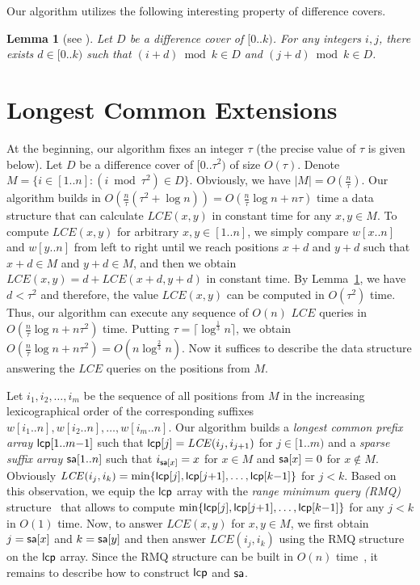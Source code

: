 \documentclass[3p,twocolumn]{elsarticle}
\theoremstyle{plain}
\newtheorem{lemma}{Lemma}
\theoremstyle{definition}
\newcommand{\LCE}{\mathit{LCE}}
\newcommand{\lcp}{{\sf lcp}}
\newcommand{\sa}{{\sf sa}}
\begin{document}
Our algorithm utilizes the following interesting property of difference covers.
\begin{lemma}[see \cite{BurkhardtKarkkainen}]
Let $D$ be a difference cover of $[0..k)$. For any integers $i,j$, there exists $d \in [0..k)$ such that $(i + d) \bmod k \in D$ and $(j + d) \bmod k \in D$.\label{DiffCoverProperty}
\end{lemma}


\section{Longest Common Extensions}

At the beginning, our algorithm fixes an integer $\tau$ (the precise value of $\tau$ is given below). Let $D$ be a difference cover of $[0..\tau^2)$ of size $O(\tau)$. Denote $M = \{i \in [1..n] \colon (i \bmod \tau^2) \in D\}$. Obviously, we have $|M| = O(\frac{n}{\tau})$. Our algorithm builds in $O(\frac{n}{\tau}(\tau^2 + \log n)) = O(\frac{n}{\tau}\log n + n\tau)$ time a data structure that can calculate $\LCE(x, y)$ in constant time for any $x,y \in M$. To compute $\LCE(x, y)$ for arbitrary $x, y \in [1..n]$, we simply compare $w[x..n]$ and $w[y..n]$ from left to right until we reach positions $x+d$ and $y+d$ such that $x+d \in M$ and $y+d \in M$, and then we obtain $\LCE(x, y) = d + \LCE(x + d, y + d)$ in constant time. By Lemma~\ref{DiffCoverProperty}, we have $d < \tau^2$ and therefore, the value $\LCE(x, y)$ can be computed in $O(\tau^2)$ time. Thus, our algorithm can execute any sequence of $O(n)$ $\LCE$ queries in $O(\frac{n}{\tau}\log n + n\tau^2)$ time. Putting $\tau = \lceil\log^{\frac{1}3} n\rceil$, we obtain $O(\frac{n}{\tau}\log n + n\tau^2) = O(n\log^{\frac{2}{3}} n)$. Now it suffices to describe the data structure answering the $\LCE$ queries on the positions from $M$.

Let $i_1, i_2, \ldots, i_m$ be the sequence of all positions from $M$ in the increasing lexicographical order of the corresponding suffixes $w[i_1..n], w[i_2..n], \ldots, w[i_m..n]$. Our algorithm builds a \emph{longest common prefix array} $\lcp[1..m{-}1]$ such that $\lcp[j] = \LCE(i_j, i_{j+1})$ for $j \in [1..m)$ and a \emph{sparse suffix array} $\sa[1..n]$ such that $i_{\sa[x]} = x$ for $x \in M$ and $\sa[x] = 0$ for $x\notin M$. Obviously $\LCE(i_j, i_k) = \min\{\lcp[j], \lcp[j{+}1], \ldots, \lcp[k{-}1]\}$ for $j < k$. Based on this observation, we equip the $\lcp$ array with the \emph{range minimum query (RMQ)} structure~\cite{FischerHeun} that allows to compute $\min\{\lcp[j], \lcp[j{+}1], \ldots, \lcp[k{-}1]\}$ for any $j < k$ in $O(1)$ time. Now, to answer $\LCE(x, y)$ for $x, y \in M$, we first obtain $j = \sa[x]$ and $k = \sa[y]$ and then answer $\LCE(i_j, i_k)$ using the RMQ structure on the $\lcp$ array. Since the RMQ structure can be built in $O(n)$ time~\cite{FischerHeun}, it remains to describe how to construct $\lcp$ and $\sa$.
\end{document}

